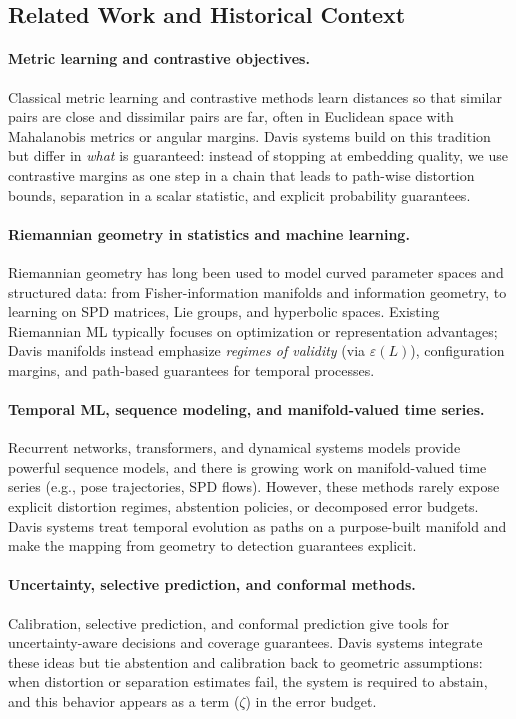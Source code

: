 \documentclass[11pt]{article}
\theoremstyle{remark}
\theoremstyle{plain}
\begin{document}
\subsection{Related Work and Historical Context}
\label{sec:related-work}

\paragraph{Metric learning and contrastive objectives.}
Classical metric learning and contrastive methods learn distances so that similar pairs are close and dissimilar pairs are far, often in Euclidean space with Mahalanobis metrics or angular margins. Davis systems build on this tradition but differ in \emph{what} is guaranteed: instead of stopping at embedding quality, we use contrastive margins as one step in a chain that leads to path-wise distortion bounds, separation in a scalar statistic, and explicit probability guarantees.

\paragraph{Riemannian geometry in statistics and machine learning.}
Riemannian geometry has long been used to model curved parameter spaces and structured data: from Fisher-information manifolds and information geometry, to learning on SPD matrices, Lie groups, and hyperbolic spaces. Existing Riemannian ML typically focuses on optimization or representation advantages; Davis manifolds instead emphasize \emph{regimes of validity} (via $\varepsilon(L)$), configuration margins, and path-based guarantees for temporal processes.

\paragraph{Temporal ML, sequence modeling, and manifold-valued time series.}
Recurrent networks, transformers, and dynamical systems models provide powerful sequence models, and there is growing work on manifold-valued time series (e.g., pose trajectories, SPD flows). However, these methods rarely expose explicit distortion regimes, abstention policies, or decomposed error budgets. Davis systems treat temporal evolution as paths on a purpose-built manifold and make the mapping from geometry to detection guarantees explicit.

\paragraph{Uncertainty, selective prediction, and conformal methods.}
Calibration, selective prediction, and conformal prediction give tools for uncertainty-aware decisions and coverage guarantees. Davis systems integrate these ideas but tie abstention and calibration back to geometric assumptions: when distortion or separation estimates fail, the system is required to abstain, and this behavior appears as a term ($\zeta$) in the error budget.
\end{document}
